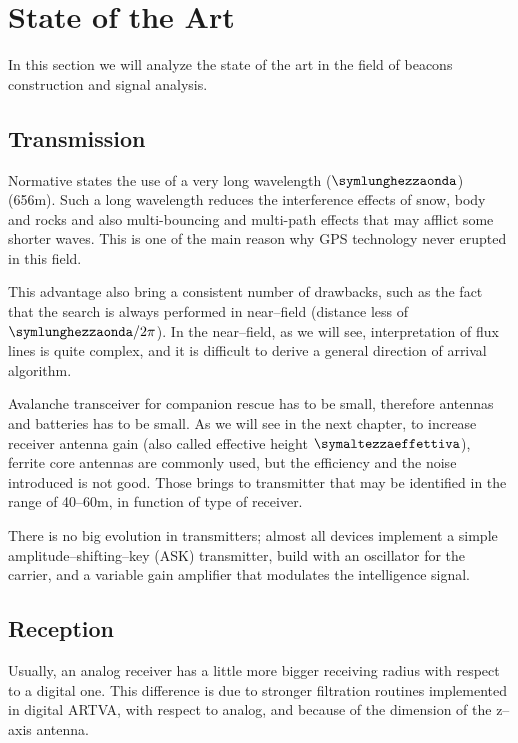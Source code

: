 \section{State of the Art}

In this section we will analyze the state of the art in the field of beacons construction and signal analysis.

\subsection{Transmission}

Normative states the use of a very long wavelength ($\symlunghezzaonda$) (\num{656}\si{\meter}). Such a long wavelength reduces the interference effects of snow, body and rocks and also multi-bouncing and multi-path effects\citep{balanis2012antenna} that may afflict some shorter waves. This is one of the main reason why GPS technology never erupted in this field\citep{457andfuture}.

This advantage also bring a consistent number of drawbacks, such as the fact that the search is always performed in near--field (distance less of $\symlunghezzaonda/2\pi$). In the near--field, as we will see, interpretation of flux lines is quite complex, and it is difficult to derive a general direction of arrival algorithm.

Avalanche transceiver for companion rescue has to be small, therefore antennas and batteries has to be small. As we will see in the next chapter, to increase receiver antenna gain (also called effective height $\symaltezzaeffettiva$), ferrite core antennas are commonly used, but the efficiency and the noise introduced is not good. Those brings to transmitter that may be identified in the range of \numrange{40}{60}\si{\meter}, in function of type of receiver.

There is no big evolution in transmitters; almost all devices implement a simple amplitude--shifting--key (ASK) transmitter, build with an oscillator for the carrier, and a variable gain amplifier that modulates the intelligence signal.

\subsection{Reception}

Usually, an analog receiver has a little more bigger receiving radius with respect to a digital one. This difference is due to stronger filtration routines implemented in digital ARTVA, with respect to analog, and because of the dimension of the z--axis antenna.

